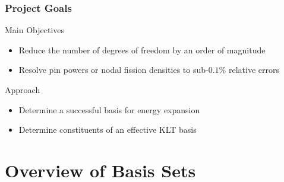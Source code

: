 \documentclass[fleqn]{beamer}
\begin{document}
  \begin{frame}
      \frametitle{Project Goals}
      \begin{block}{Main Objectives}
          \begin{itemize}
              \item Reduce the number of degrees of freedom by an order of 
              magnitude
              \item Resolve pin powers or nodal fission densities to 
              sub-$0.1\%$ relative errors
          \end{itemize}
      \end{block}
      \begin{block}{Approach}
          \begin{itemize}
              \item Determine a successful basis for energy expansion
              \item Determine constituents of an effective KLT basis
          \end{itemize}
      \end{block}
  \end{frame}
  
  \section{Overview of Basis Sets}
  
\end{document}

